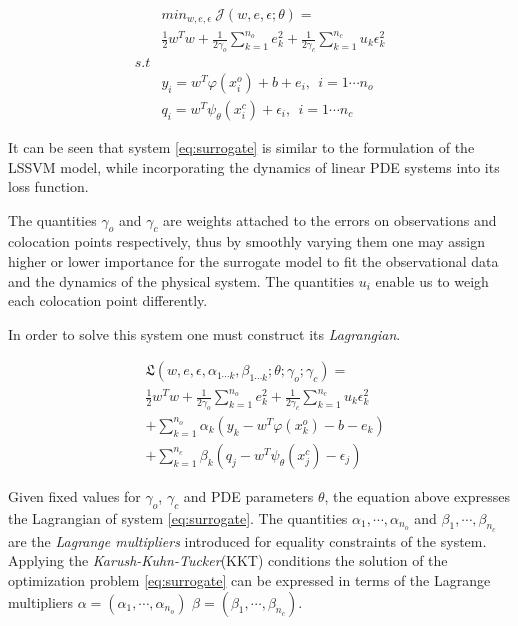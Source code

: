 \begin{align}\label{eq:surrogate}
   & min_{w,e,\epsilon} \ \mathcal{J}(w,e,\epsilon;\theta) = \\
   & \frac{1}{2} w^{T}w + \frac{1}{2\gamma_{o}} \sum_{k = 1}^{n_{o}}{e^{2}_{k}} + \frac{1}{2\gamma_{c}} \sum_{k = 1}^{n_{c}}{u_{k} \epsilon^{2}_{k}} \\
  s.t &\nonumber \\
  & y_{i}  = w^{T}\varphi(x^{o}_{i}) + b + e_{i}, \ \ i = 1 \cdots n_{o} \\
  & q_{i} = w^{T}\psi_{\theta}(x^{c}_{i}) + \epsilon_{i}, \ \ i = 1 \cdots n_{c}
\end{align}

It can be seen that system \ref{eq:surrogate} is similar to the
formulation of the LSSVM model, while incorporating the dynamics of
linear PDE systems into its loss function. 

The quantities $\gamma_{o}$ and $\gamma_{c}$ are weights attached to
the errors on observations and colocation points respectively, thus
by smoothly varying them one may assign higher or lower importance for
the surrogate model to fit the observational data and the dynamics of
the physical system. The quantities $u_i$ enable us to weigh each colocation
point differently.

In order to solve this system one must construct its
\emph{Lagrangian}.

\begin{align*}\label{eq:lag}
      & \mathfrak{L}(w,e,\epsilon, \alpha_{1 \cdots k}, \beta_{1 \cdots k}; \theta; \gamma_{o}; \gamma_{c}) = \\ 
      & \frac{1}{2} w^{T}w + \frac{1}{2\gamma_{o}} \sum_{k = 1}^{n_{o}}{e^{2}_{k}} +
      \frac{1}{2\gamma_{c}} \sum_{k = 1}^{n_{c}}{u_{k} \epsilon^{2}_{k}} \\
      & + \sum_{k = 1}^{n_{o}}{\alpha_{k}(y_{k} - w^{T}\varphi(x^{o}_{k}) - b - e_{k})} \\
      & + \sum_{k = 1}^{n_{c}}{\beta_{k} (q_{j} - w^{T}\psi_{\theta}(x^{c}_{j}) - \epsilon_{j})} 
\end{align*}

Given fixed values for $\gamma_{o}$, $\gamma_{c}$ and PDE parameters
$\theta$, the equation above expresses the Lagrangian of system
\ref{eq:surrogate}. The quantities $\alpha_{1}, \cdots, \alpha_{n_{o}}$ and
$\beta_{1}, \cdots, \beta_{n_{c}}$ are the \emph{Lagrange multipliers}
introduced for equality constraints of the system. Applying the
\emph{Karush-Kuhn-Tucker}(KKT) conditions the solution of the
optimization problem \ref{eq:surrogate} can be expressed in terms of
the Lagrange multipliers $\alpha = (\alpha_{1}, \cdots, \alpha_{n_{o}})$
$\beta = (\beta_{1}, \cdots, \beta_{n_{c}})$.

